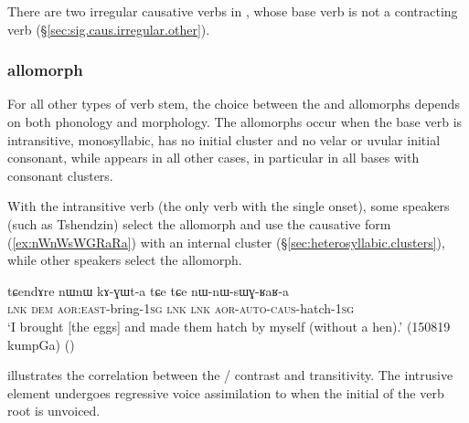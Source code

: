 There are two irregular causative verbs in , whose base verb is not a contracting verb (§\ref{sec:sig.caus.irregular.other}).

\subsubsection{ allomorph} \label{sec:caus.sWG}
For all other types of verb stem, the choice between the  and  allomorphs depends on both phonology and morphology. The  allomorphs occur when the base verb is intransitive, monosyllabic, has no initial cluster and no velar or uvular initial consonant, while  appears in all other cases, in particular in all bases with consonant clusters. 

With the intransitive verb  (the only verb with the single  onset), some speakers (such as Tshendzin) select the  allomorph and use the causative form   (\ref{ex:nWnWsWGRaRa}) with an internal  cluster (§\ref{sec:heterosyllabic.clusters}), while other speakers select the  allomorph.

\begin{exe}
\ex \label{ex:nWnWsWGRaRa}
\gll tɕendɤre nɯnɯ kɤ-ɣɯt-a tɕe tɕe nɯ-nɯ-sɯɣ-ʁaʁ-a    \\
\textsc{lnk} \textsc{dem} \textsc{aor}:\textsc{east}-bring-\textsc{1sg} \textsc{lnk} \textsc{lnk} \textsc{aor}-\textsc{auto}-\textsc{caus}-hatch-\textsc{1sg}   \\
\glt `I brought [the eggs] and made them hatch by myself (without a hen).' (150819 kumpGa)
()
\end{exe}

 illustrates the correlation between the  /  contrast and transitivity. The intrusive  element undergoes regressive voice assimilation to  when the initial of the verb root is unvoiced.   
 

